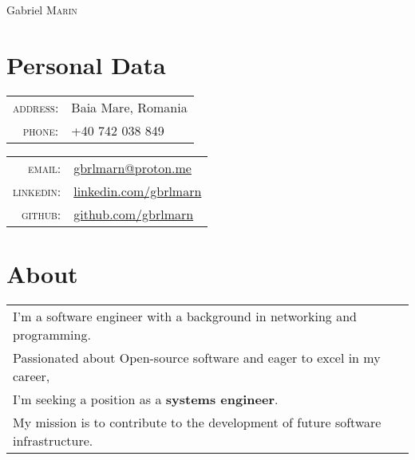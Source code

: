 \documentclass[a4paper,10pt]{article}
\begin{document}
\pagestyle{empty}

\par
  {\centering
    {\Huge Gabriel \textsc{Marin}}
    \bigskip\par
  }

\section{Personal Data}
\begin{multicols}{2}
  \begin{tabular}{rl}
    \textsc{address:}&Baia Mare, Romania\\
    \textsc{phone:}&+40 742 038 849\\
  \end{tabular}
    \columnbreak
  \begin{tabular}{rl}
    \textsc{email:}&\href{mailto:gbrlmarn@proton.me}
      {gbrlmarn@proton.me}\\
    \textsc{linkedin:}&\href{https://linkedin.com/in/gbrlmarn}
      {linkedin.com/gbrlmarn}\\
    \textsc{github:}&\href{https://github.com/gbrlmarn}
      {github.com/gbrlmarn}\\
  \end{tabular}
\end{multicols}

\section{About}
\begin{tabular}{l}
I'm a software engineer with a background in networking and programming. \\
Passionated about Open-source software and eager to excel in my career, \\
I'm seeking a position as a \textbf{systems engineer}.\\ 
My mission is to contribute to the development of future software infrastructure.\\
\end{tabular}

\end{document}
